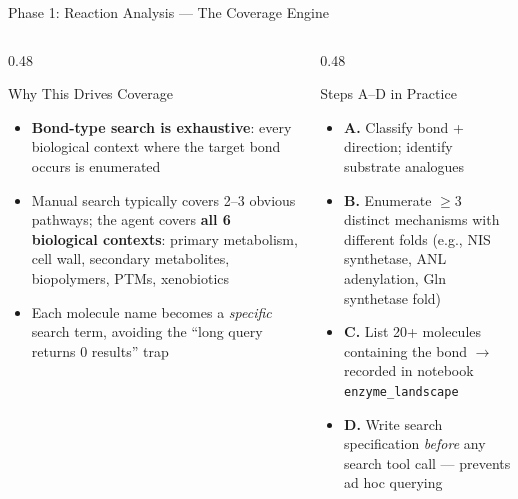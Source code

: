 \documentclass[aspectratio=169, 11pt]{beamer}
\begin{document}
\begin{frame}{Phase 1: Reaction Analysis --- The Coverage Engine}
\vspace{-2pt}
\begin{columns}[T]
\begin{column}{0.48\textwidth}
\begin{block}{\small Why This Drives Coverage}
\vspace{-2pt}
\begin{itemize}\scriptsize
\setlength\itemsep{1pt}
\item \textbf{Bond-type search is exhaustive}: every biological context where the target bond occurs is enumerated
\item Manual search typically covers 2--3 obvious pathways; the agent covers \textbf{all 6 biological contexts}: primary metabolism, cell wall, secondary metabolites, biopolymers, PTMs, xenobiotics
\item Each molecule name becomes a \textit{specific} search term, avoiding the ``long query returns 0 results'' trap
\end{itemize}
\end{block}
\end{column}
\begin{column}{0.48\textwidth}
\begin{exampleblock}{\small Steps A--D in Practice}
\vspace{-2pt}
\begin{itemize}\scriptsize
\setlength\itemsep{1pt}
\item \textbf{A.} Classify bond + direction; identify substrate analogues
\item \textbf{B.} Enumerate $\geq$3 distinct mechanisms with different folds (e.g., NIS synthetase, ANL adenylation, Gln synthetase fold)
\item \textbf{C.} List 20+ molecules containing the bond $\rightarrow$ recorded in notebook \texttt{enzyme\_landscape}
\item \textbf{D.} Write search specification \textit{before} any search tool call --- prevents ad hoc querying
\end{itemize}
\end{exampleblock}
\end{column}
\end{columns}
\end{frame}
\end{document}
